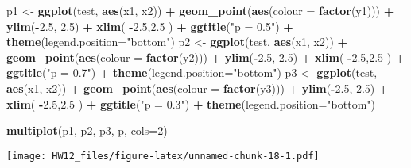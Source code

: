 \documentclass[]{article}
\newenvironment{Shaded}{\begin{snugshade}}{\end{snugshade}}
\newcommand{\KeywordTok}[1]{\textcolor[rgb]{0.13,0.29,0.53}{\textbf{#1}}}
\newcommand{\DataTypeTok}[1]{\textcolor[rgb]{0.13,0.29,0.53}{#1}}
\newcommand{\DecValTok}[1]{\textcolor[rgb]{0.00,0.00,0.81}{#1}}
\newcommand{\FloatTok}[1]{\textcolor[rgb]{0.00,0.00,0.81}{#1}}
\newcommand{\StringTok}[1]{\textcolor[rgb]{0.31,0.60,0.02}{#1}}
\newcommand{\OperatorTok}[1]{\textcolor[rgb]{0.81,0.36,0.00}{\textbf{#1}}}
\newcommand{\NormalTok}[1]{#1}
\begin{document}
\begin{Shaded}
\begin{Highlighting}[]
\NormalTok{p1 <-}\StringTok{ }\KeywordTok{ggplot}\NormalTok{(test, }\KeywordTok{aes}\NormalTok{(x1, x2)) }\OperatorTok{+}\StringTok{ }\KeywordTok{geom_point}\NormalTok{(}\KeywordTok{aes}\NormalTok{(}\DataTypeTok{colour =} \KeywordTok{factor}\NormalTok{(y1))) }\OperatorTok{+}
\StringTok{  }\KeywordTok{ylim}\NormalTok{(}\OperatorTok{-}\FloatTok{2.5}\NormalTok{, }\FloatTok{2.5}\NormalTok{) }\OperatorTok{+}\StringTok{ }\KeywordTok{xlim}\NormalTok{( }\OperatorTok{-}\FloatTok{2.5}\NormalTok{,}\FloatTok{2.5}\NormalTok{ ) }\OperatorTok{+}\StringTok{ }\KeywordTok{ggtitle}\NormalTok{(}\StringTok{"p = 0.5"}\NormalTok{) }\OperatorTok{+}
\StringTok{  }\KeywordTok{theme}\NormalTok{(}\DataTypeTok{legend.position=}\StringTok{"bottom"}\NormalTok{)}
\NormalTok{p2 <-}\StringTok{ }\KeywordTok{ggplot}\NormalTok{(test, }\KeywordTok{aes}\NormalTok{(x1, x2)) }\OperatorTok{+}\StringTok{ }\KeywordTok{geom_point}\NormalTok{(}\KeywordTok{aes}\NormalTok{(}\DataTypeTok{colour =} \KeywordTok{factor}\NormalTok{(y2))) }\OperatorTok{+}
\StringTok{  }\KeywordTok{ylim}\NormalTok{(}\OperatorTok{-}\FloatTok{2.5}\NormalTok{, }\FloatTok{2.5}\NormalTok{) }\OperatorTok{+}\StringTok{ }\KeywordTok{xlim}\NormalTok{( }\OperatorTok{-}\FloatTok{2.5}\NormalTok{,}\FloatTok{2.5}\NormalTok{ ) }\OperatorTok{+}\StringTok{ }\KeywordTok{ggtitle}\NormalTok{(}\StringTok{"p = 0.7"}\NormalTok{) }\OperatorTok{+}
\StringTok{  }\KeywordTok{theme}\NormalTok{(}\DataTypeTok{legend.position=}\StringTok{"bottom"}\NormalTok{)}
\NormalTok{p3 <-}\StringTok{ }\KeywordTok{ggplot}\NormalTok{(test, }\KeywordTok{aes}\NormalTok{(x1, x2)) }\OperatorTok{+}\StringTok{ }\KeywordTok{geom_point}\NormalTok{(}\KeywordTok{aes}\NormalTok{(}\DataTypeTok{colour =} \KeywordTok{factor}\NormalTok{(y3))) }\OperatorTok{+}
\StringTok{  }\KeywordTok{ylim}\NormalTok{(}\OperatorTok{-}\FloatTok{2.5}\NormalTok{, }\FloatTok{2.5}\NormalTok{) }\OperatorTok{+}\StringTok{ }\KeywordTok{xlim}\NormalTok{( }\OperatorTok{-}\FloatTok{2.5}\NormalTok{,}\FloatTok{2.5}\NormalTok{ ) }\OperatorTok{+}\StringTok{ }\KeywordTok{ggtitle}\NormalTok{(}\StringTok{"p = 0.3"}\NormalTok{) }\OperatorTok{+}
\StringTok{  }\KeywordTok{theme}\NormalTok{(}\DataTypeTok{legend.position=}\StringTok{"bottom"}\NormalTok{)}

\KeywordTok{multiplot}\NormalTok{(p1, p2, p3, p,  }\DataTypeTok{cols=}\DecValTok{2}\NormalTok{)}
\end{Highlighting}
\end{Shaded}

\texttt{[image: HW12\_files/figure-latex/unnamed-chunk-18-1.pdf]}
\end{document}
